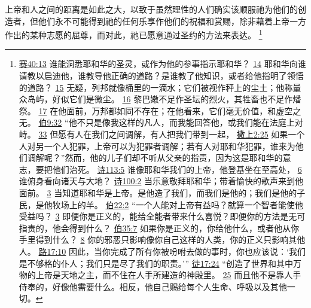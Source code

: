 \documentclass[12pt, a4paper, oneside]{ctexart}
\newcounter{parnum}[section]
\newcommand{\N}{%
   \noindent\refstepcounter{parnum}%
    \makebox[\parindent][l]{\textbf{\arabic{parnum}.}}}
\begin{document}
\N 上帝和人之间的距离是如此之大，以致于虽然理性的人们确实该顺服祂为他们的创造者，但他们永不可能得到祂的任何乐享作他们的祝福和赏赐，除非藉着上帝一方作出的某种志愿的屈尊，而对此，祂已愿意通过圣约的方法来表达。
	\footnote {
		\href{https://biblehub.com/isaiah/40-13.htm}{赛40:13} 谁能洞悉耶和华的圣灵，或作为他的参事指示耶和华？
		\href{https://biblehub.com/isaiah/40-14.htm}{14} 耶和华向谁请教以启迪他，谁教导他正确的道路？是谁教了他知识，或者给他指明了领悟的道路？
		\href{https://biblehub.com/isaiah/40-15.htm}{15} 无疑，列邦就像桶里的一滴水；它们被视作秤上的尘土；他称量众岛屿，好似它们是微尘。
		\href{https://biblehub.com/isaiah/40-16.htm}{16} 黎巴嫩不足作圣坛的烈火，其牲畜也不足作燔祭。
		\href{https://biblehub.com/isaiah/40-17.htm}{17} 在他面前，万邦都如同不存在；在他看来，它们毫无价值，和虚空之无。
		\href{https://biblehub.com/job/9-32.htm}{伯9:32} “他不只是像我这样的凡人，而我能回答他，或我们能在法庭上对峙。
		\href{https://biblehub.com/job/9-33.htm}{33} 但愿有人在我们之间调解，有人把我们带到一起，
		\href{https://biblehub.com/1_samuel/2-25.htm}{撒上2:25} 如果一个人对另一个人犯罪，上帝可以为犯罪者调解；若有人对耶和华犯罪，谁来为他们调解呢？”然而，他的儿子们却不听从父亲的指责，因为这是耶和华的意志，要把他们治死。
		\href{https://biblehub.com/psalms/113-5.htm}{诗113:5} 谁像耶和华我们的上帝，他登基坐在至高处，
		\href{https://biblehub.com/psalms/113-6.htm}{6} 谁俯身看向诸天与大地？
		\href{https://biblehub.com/psalms/100-2.htm}{诗100:2} 当乐意敬拜耶和华；带着愉快的歌声来到他面前。
		\href{https://biblehub.com/psalms/100-3.htm}{3} 当知道耶和华是上帝。是他造了我们，而我们是他的；我们是他的子民，是他牧场上的羊。
		\href{https://biblehub.com/job/22-2.htm}{伯22:2} “一个人能对上帝有益吗？就算一个智者能使他受益吗？
		\href{https://biblehub.com/job/22-3.htm}{3} 即便你是正义的，能给全能者带来什么喜悦？即便你的方法是无可指责的，他会得到什么？
		\href{https://biblehub.com/job/35-7.htm}{伯35:7} 如果你是正义的，你给他什么，或者他从你手里得到什么？
		\href{https://biblehub.com/job/35-8.htm}{8} 你的邪恶只影响像你自己这样的人类，你的正义只影响其他人。
		\href{https://biblehub.com/luke/17-10.htm}{路17:10} 因此，当你完成了所有你被吩咐去做的事时，你也应该说：‘我们是不够格的仆人；我们只是尽了我们的职责。’”
		\href{https://biblehub.com/acts/17-24.htm}{徒17:24} “创造了世界和其中万物的上帝是天地之主，而不住在人手所建造的神殿里。
		\href{https://biblehub.com/acts/17-25.htm}{25} 而且他不是靠人手侍奉的，好像他需要什么。相反，他自己赐给每个人生命、呼吸以及其他一切。 
	}
\end{document}
